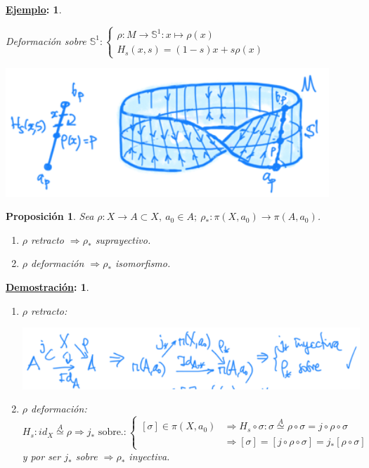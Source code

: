 \documentclass[10pt,a4paper,openright]{book}
\theoremstyle{break}
\newtheorem*{prop}{Proposición}
\newtheorem*{demo}{\underline{Demostración}:}
\newtheorem*{ej}{\underline{Ejemplo}:}
\begin{document}
\begin{ej}
\begin{enumerate}
    Deformación sobre $\mathbb{S}^1: \begin{cases}
        \rho: M \rightarrow \mathbb{S}^1: x \mapsto \rho\left( x \right)\\
        H_s\left( x, s \right) = \left( 1 - s \right) x + s\rho\left( x \right) 
    \end{cases}$
    \begin{center}
        \includegraphics[scale=0.3]{images/deformacion_moebius} 
    \end{center}
\end{enumerate}
\end{ej}

\begin{prop}
Sea $\rho: X \rightarrow A \subset X,\ a_0 \in A;\ \rho_*: \pi\left( X, a_0 \right) \rightarrow \pi\left( A, a_0 \right)$.
\begin{enumerate}
    \item $\rho$ retracto $\Rightarrow \rho_*$ suprayectivo.
    \item $\rho$ deformación $\Rightarrow \rho_*$ isomorfismo.
\end{enumerate}
\end{prop}
\begin{demo}
\begin{enumerate}
    \item $\rho$ retracto:
    \begin{center}
        \includegraphics[scale=0.3]{images/dem_retracto_sobre} 
    \end{center}

    \item $\rho$ deformación:
    \[
    H_s: id_X \stackrel{A}{\simeq} \rho \Rightarrow j_* \text{ sobre.} : \begin{cases}
        \left[ \sigma \right] \in \pi\left( X, a_0 \right) &\Rightarrow H_s \circ \sigma: \sigma \stackrel{A}{\simeq} \rho \circ \sigma = j \circ \rho \circ \sigma\\
           &\Rightarrow \left[ \sigma \right] = \left[ j \circ \rho \circ \sigma \right] = j_*\left[ \rho \circ \sigma \right] 
    \end{cases} 
    \]
    y por ser $j_*$ sobre $\Rightarrow \rho_*$ inyectiva.
\end{enumerate}
\end{demo}
\end{document}
